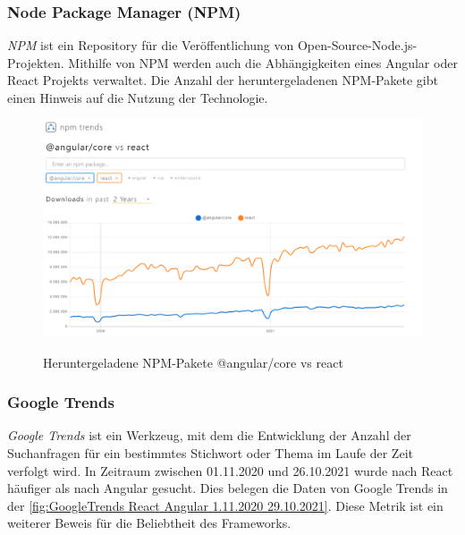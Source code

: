 \newpage
\subsubsection*{Node Package Manager (NPM)}
\textit{NPM} ist ein Repository für die Veröffentlichung von Open-Source-Node.js-Projekten. Mithilfe von NPM werden auch die Abhängigkeiten eines Angular oder React Projekts verwaltet. Die Anzahl der heruntergeladenen NPM-Pakete gibt einen Hinweis auf die Nutzung der Technologie.
\begin{figure}[h!]
  \centering
  \includegraphics[scale=0.4]{sources/NPM-Trends React_Angular}
  \caption[Heruntergeladene NPM-Pakete]{}
  \label{fig:NPM-Trends React_Angular} 
  Heruntergeladene NPM-Pakete @angular/core vs react
   {\cite{NPM01}}
\end{figure}


\subsubsection*{Google Trends}
\textit{Google Trends} ist ein Werkzeug, mit dem die Entwicklung der Anzahl der Suchanfragen für ein bestimmtes Stichwort oder Thema im Laufe der Zeit verfolgt wird\cite{GO02}. In Zeitraum zwischen 01.11.2020 und 26.10.2021 wurde nach React häufiger als nach Angular gesucht. Dies belegen die Daten von Google Trends in der \autoref{fig:GoogleTrends React Angular 1.11.2020 29.10.2021}. Diese Metrik ist ein weiterer Beweis für die Beliebtheit des Frameworks.

